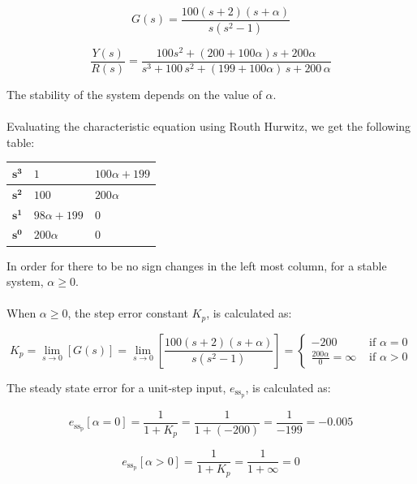 \documentclass[12pt, letterpaper]{../assignment}
\begin{document}
$$ G(s) = \frac{100(s+2)(s+\alpha)}{s(s^2 -1)} $$

$$ \frac{Y(s)}{R(s)} = \frac{100s^2 + (200 + 100 \alpha)s + 200 \alpha}{s^3+100\,s^2+(199+100 \alpha) \,s+200\,\alpha } $$

The stability of the system depends on the value of $\alpha$.
\\\\
Evaluating the characteristic equation using Routh Hurwitz, we get the following table:

\begin{center}
    \begin{tabular}{ | m{2em} | m{15em}| m{15em} | } 
      \hline
      $\mathbf{s^3}$ & $1$ & $100 \alpha + 199$ \\ 
      \hline
      $\mathbf{s^2}$ & $100$ & $200 \alpha$ \\ 
      \hline
      $\mathbf{s^1}$ & $98 \alpha + 199$ & 0 \\ 
      \hline
      $\mathbf{s^0}$ & $200 \alpha$ & 0 \\ 
      \hline
    \end{tabular}
\end{center}

In order for there to be no sign changes in the left most column, for a stable system, $\alpha \geq 0$.
\\\\
When $\alpha \geq 0$, the step error constant $K_p$, is calculated as:

$$ K_p = \lim_{s \to 0} \left[ G(s) \right]
       = \lim_{s \to 0} \left[ \frac{100(s+2)(s+\alpha)}{s(s^2 -1)} \right]
       = \left\{\begin{array}{cl} -200 & \text{\ if\ \ }\alpha =0\\ \frac{200 \alpha}{0} = \infty & \text{\ if\ \ }\alpha > 0 \end{array}\right.$$

The steady state error for a unit-step input, ${e_{\text{ss}_\text{p}}}$, is calculated as:

\begin{answer}
$$ {e_{\text{ss}_\text{p}}}[\alpha = 0] = \frac{1}{1 + K_p} = \frac{1}{1 + (-200)} = \frac{1}{-199} = -0.005 $$
\end{answer}

\begin{answer}
$$ {e_{\text{ss}_\text{p}}}[\alpha > 0] = \frac{1}{1 + K_p} = \frac{1}{1 + \infty} = 0 $$
\end{answer}
\end{document}
